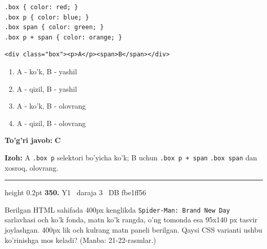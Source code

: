 \documentclass[10pt,a4paper,oneside]{article}
\begin{document}
\par
\begin{lstlisting}
.box { color: red; }
.box p { color: blue; }
.box span { color: green; }
.box p + span { color: orange; }
\end{lstlisting}
\par
\begin{lstlisting}
<div class="box"><p>A</p><span>B</span></div>
\end{lstlisting}

\begin{enumerate}[label=\Alph*),leftmargin=9mm]
\item A - ko'k, B - yashil
\item A - qizil, B - yashil
\item A - ko'k, B - olovrang
\item A - qizil, B - olovrang
\end{enumerate}
\begin{tcolorbox}[enhanced,breakable,colback=teal!4,colframe=teal!45!black,boxrule=0.45pt,arc=1.2mm,left=2.8mm,right=2.8mm,top=2mm,bottom=2mm,before skip=2mm,after skip=2mm]
\textbf{\color{teal}To'g'ri javob:} \textbf{C}
\par\smallskip
\textbf{Izoh:} A \texttt{.box p} selektori bo'yicha ko'k; B uchun \texttt{.box p + span} \texttt{.box span} dan xosroq, olovrang.
\end{tcolorbox}
\vspace{2mm}\hrule height 0.2pt \vspace{4mm}
\hypertarget{q350}{\textbf{\color{ink}350.}}  {\color{muted}\scriptsize Y1 \textbullet\ daraja 3 \textbullet\ DB fbe1ff56}
\par
Berilgan HTML sahifada 400px kenglikda \texttt{Spider-Man: Brand New Day} sarlavhasi och ko'k fonda, matn ko'k rangda, o'ng tomonda esa 95x140 px tasvir joylashgan. 400px lik och kulrang matn paneli berilgan. Qaysi CSS varianti ushbu ko'rinishga mos keladi? (Manba: 21-22-rasmlar.)
\end{document}
